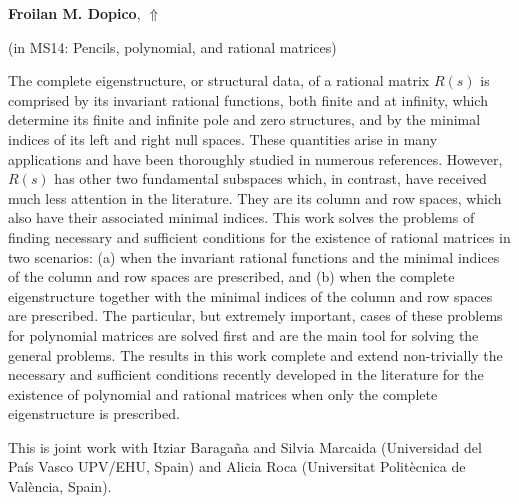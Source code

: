 \documentclass[ILAS2025-program.tex]{subfiles}
\begin{document}
     \hypertarget{down0330}{}\begin{ilasabstract}
    
    \textbf{Froilan M. Dopico},  \hfill \hyperlink{up0330}{$\Uparrow$}
    
    (in {\color{mstitle}MS14: Pencils, polynomial, and rational matrices})
        
        \mtskip
    The complete eigenstructure, or structural data, of a rational matrix
$R(s)$ is comprised by its invariant rational functions, both finite
and at infinity, which determine its finite and infinite pole and zero
structures, and by the minimal indices of its left and right null spaces.
These quantities arise in many applications and have been thoroughly
studied in numerous references. However, $R(s)$ has other two fundamental
subspaces which, in contrast, have received much less attention
in the literature. They are its column and row spaces, which also have
their associated minimal indices. This work solves the problems of
finding necessary and sufficient conditions for the existence of rational
matrices in two scenarios: (a) when the invariant rational functions and the minimal indices of the column and row spaces are prescribed,
and (b) when the complete eigenstructure together with the minimal
indices of the column and row spaces are prescribed. The particular,
but extremely important, cases of these problems for polynomial matrices
are solved first and are the main tool for solving the general
problems. The results in this work complete and extend non-trivially
the necessary and sufficient conditions recently developed in the literature
for the existence of polynomial and rational matrices when only
the complete eigenstructure is prescribed.

This is joint work with Itziar Baraga\~na and Silvia Marcaida (Universidad del Pa\'is Vasco UPV/EHU, Spain) and Alicia Roca (Universitat Polit\`ecnica de Val\`encia, Spain).\end{ilasabstract}
\end{document}
